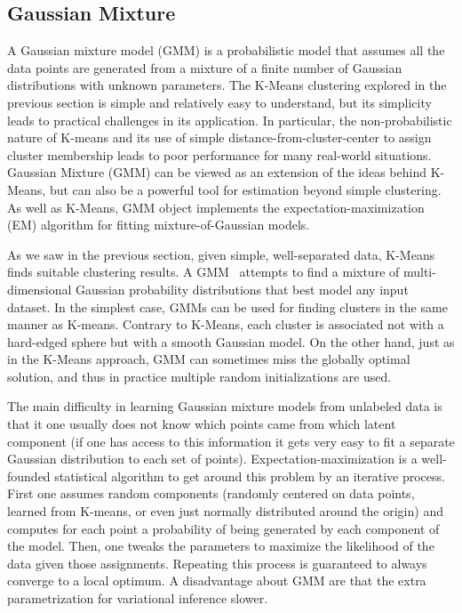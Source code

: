 \documentclass[fleqn,usenatbib]{mnras}
\begin{document}
\subsection{Gaussian Mixture}


A Gaussian mixture model (GMM) is a probabilistic model that assumes all the data points are generated from a mixture of a finite number of Gaussian
distributions with unknown parameters. The K-Means clustering explored in the previous section is simple and relatively easy to understand, but its simplicity leads to practical challenges in its application. In particular, the non-probabilistic nature of K-means and its use of simple distance-from-cluster-center to assign cluster membership leads to poor performance for many real-world situations. Gaussian Mixture (GMM) can be viewed as an extension of the ideas behind K-Means, but can also be a powerful tool for estimation beyond simple clustering. As well as K-Means, GMM object implements the expectation-maximization (EM) algorithm for fitting mixture-of-Gaussian models.

As we saw in the previous section, given simple, well-separated data, K-Means finds suitable clustering results. A GMM~\cite{} attempts to find a mixture of multi-dimensional Gaussian probability distributions that best model any input dataset. In the simplest case, GMMs can be used for finding clusters in the same manner as K-means. Contrary to K-Means, each cluster is associated not with a hard-edged sphere but with a smooth Gaussian model. On the other hand, just as in the K-Means  approach, GMM can sometimes miss the globally optimal solution, and thus in practice multiple random initializations are used.



The main difficulty in learning Gaussian mixture models from unlabeled data is that it one usually does not know which points came from which latent component (if one has access to this information it gets very easy to fit a separate Gaussian distribution to each set of points). Expectation-maximization is a well-founded statistical algorithm to get around this problem by an iterative process. First one assumes random components (randomly centered on data points, learned from K-means, or even just normally distributed around the origin) and computes for each point a probability of being generated by each component of the model. Then, one tweaks the parameters to maximize the likelihood of the data given those assignments. Repeating this process is guaranteed to always converge to a local optimum. A disadvantage about GMM are that the extra parametrization for variational inference slower.
\end{document}
